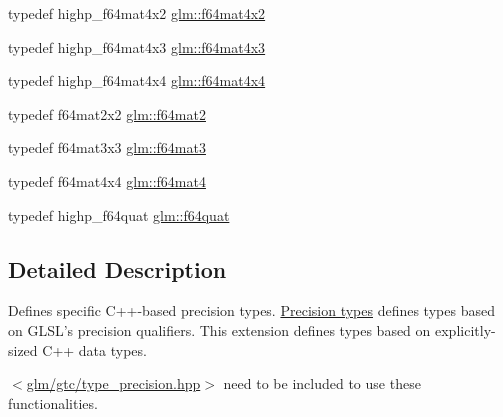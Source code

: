 \begin{DoxyCompactItemize}
\item 
typedef highp\-\_\-f64mat4x2 \hyperlink{group__gtc__type__precision_gae716a8717cc6af191aec562d93ff6299}{glm\-::f64mat4x2}
\item 
typedef highp\-\_\-f64mat4x3 \hyperlink{group__gtc__type__precision_gaca283f88500d9895afb939516e7372d1}{glm\-::f64mat4x3}
\item 
typedef highp\-\_\-f64mat4x4 \hyperlink{group__gtc__type__precision_ga37a1ae1f6e67b5a6a06b1ee7c83f4bec}{glm\-::f64mat4x4}
\item 
typedef f64mat2x2 \hyperlink{group__gtc__type__precision_gaa66040c1fd82a9d1f6ac82d4e1e8baa6}{glm\-::f64mat2}
\item 
typedef f64mat3x3 \hyperlink{group__gtc__type__precision_gaa9e69ab90c0130b9a84a0a7fd8e49664}{glm\-::f64mat3}
\item 
typedef f64mat4x4 \hyperlink{group__gtc__type__precision_ga1e2d73ea989e6a5abd90cbe9f1025a41}{glm\-::f64mat4}
\item 
typedef highp\-\_\-f64quat \hyperlink{group__gtc__type__precision_ga860589eddc4ff95795a858318652b6ff}{glm\-::f64quat}
\end{DoxyCompactItemize}


\subsection{Detailed Description}
Defines specific C++-\/based precision types. \hyperlink{group__core__precision}{Precision types} defines types based on G\-L\-S\-L's precision qualifiers. This extension defines types based on explicitly-\/sized C++ data types.

$<$\hyperlink{type__precision_8hpp}{glm/gtc/type\-\_\-precision.\-hpp}$>$ need to be included to use these functionalities. 

